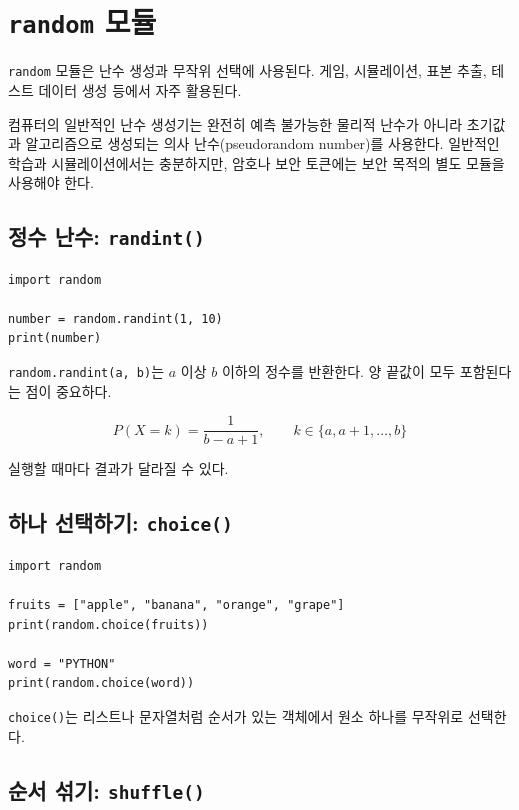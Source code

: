 \documentclass[11pt,a4paper]{article}
\begin{document}
\section{\texttt{random} 모듈}

\texttt{random} 모듈은 난수 생성과 무작위 선택에 사용된다. 게임, 시뮬레이션, 표본 추출, 테스트 데이터 생성 등에서 자주 활용된다.

컴퓨터의 일반적인 난수 생성기는 완전히 예측 불가능한 물리적 난수가 아니라 초기값과 알고리즘으로 생성되는 의사 난수(pseudorandom number)를 사용한다. 일반적인 학습과 시뮬레이션에서는 충분하지만, 암호나 보안 토큰에는 보안 목적의 별도 모듈을 사용해야 한다.

\subsection{정수 난수: \texttt{randint()}}

\begin{lstlisting}
import random

number = random.randint(1, 10)
print(number)
\end{lstlisting}

\texttt{random.randint(a, b)}는 $a$ 이상 $b$ 이하의 정수를 반환한다. 양 끝값이 모두 포함된다는 점이 중요하다.

\[
P(X=k)=\frac{1}{b-a+1}, \qquad k\in\{a,a+1,\ldots,b\}
\]

실행할 때마다 결과가 달라질 수 있다.

\subsection{하나 선택하기: \texttt{choice()}}

\begin{lstlisting}
import random

fruits = ["apple", "banana", "orange", "grape"]
print(random.choice(fruits))

word = "PYTHON"
print(random.choice(word))
\end{lstlisting}

\texttt{choice()}는 리스트나 문자열처럼 순서가 있는 객체에서 원소 하나를 무작위로 선택한다.

\subsection{순서 섞기: \texttt{shuffle()}}
\end{document}
